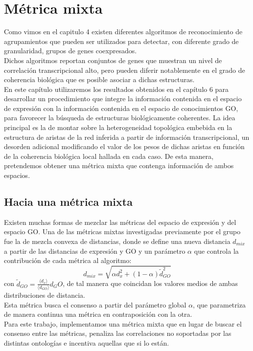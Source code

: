 \chapter{Métrica mixta}
Como vimos en el capitulo 4 existen diferentes algoritmos de reconocimiento de agrupamientos que pueden ser utilizados para detectar, con diferente grado de granularidad, grupos de genes coexpresados.\\
Dichos algoritmos reportan conjuntos de genes que muestran un nivel de correlación transcripcional alto, pero pueden diferir notablemente en el grado de coherencia biológica que es posible asociar a dichas estructuras.\\
En este capítulo utilizaremos los resultados obtenidos en el capítulo 6 para desarrollar un procedimiento que integre la información contenida en el espacio de expresión con la información contenida en el espacio de conocimientos GO, para favorecer la búsqueda de estructuras biológicamente coherentes. La idea principal es la de montar sobre la heterogeneidad topológica embebida en la estructura de aristas de la red inferida a partir de información transcripcional, un desorden adicional modificando el valor de los pesos de dichas aristas en función de la coherencia biológica local hallada en cada caso. De esta manera, pretendemos obtener una métrica mixta que contenga información de ambos espacios.

\section{Hacia una métrica mixta}
Existen muchas formas de mezclar las métricas del espacio de expresión y del espacio GO. Una de las métricas mixtas investigadas previamente por el grupo \cite{Berenstein2010} fue la de mezcla convexa de distancias, donde se define una nueva distancia $d_{mix}$ a partir de las distancias de expresión y GO y un parámetro $\alpha$ que controla la contribución de cada métrica al algoritmo:
\begin{equation}
	d_{mix} = \sqrt{\alpha d_{x}^2 + (1-\alpha)\tilde{d}_{GO}^2}
\end{equation}
con $\tilde{d}_{GO} = \frac{\langle d_x \rangle}{\langle d_{GO} \rangle}d{_GO}$, de tal manera que coincidan los valores medios de ambas distribuciones de distancia.\\
Esta métrica busca el consenso a partir del parámetro global $\alpha$, que parametriza de manera continua una métrica en contraposición con la otra.\\
Para este trabajo, implementamos una métrica mixta que en lugar de buscar el consenso entre las métricas, penaliza las correlaciones no soportadas por las distintas ontologías e incentiva aquellas que si lo están.
